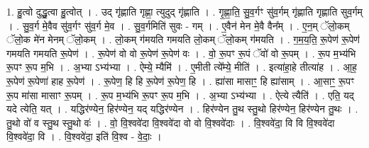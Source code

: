 \documentclass[17pt]{extarticle}
\begin{document}
1. हु॒त्वो दुद्धु॒त्वा हु॒त्वोत् । . उद् गृ॑ह्णाति गृह्णा॒ त्युदुद् गृ॑ह्णाति । . गृ॒ह्णा॒ति॒ सु॒व॒र्गꣳ सु॑व॒र्गम् गृ॑ह्णाति गृह्णाति सुव॒र्गम् । . सु॒व॒र्ग मे॒वैव सु॑व॒र्गꣳ सु॑व॒र्ग मे॒व । . सु॒व॒र्गमिति॑ सुवः - गम् । . ए॒वैन॑ मेन मे॒वै वैन᳚म् । . ए॒न॒म् ॅलो॒कम् ॅलो॒क मे॑न मेनम् ॅलो॒कम् । . लो॒कम् ग॑मयति गमयति लो॒कम् ॅलो॒कम् ग॑मयति । . ग॒म॒य॒ति॒ रू॒पेण॑ रू॒पेण॑ गमयति गमयति रू॒पेण॑ । . रू॒पेण॑ वो वो रू॒पेण॑ रू॒पेण॑ वः । . वो॒ रू॒पꣳ रू॒पं ॅवो॑ वो रू॒पम् । . रू॒प म॒भ्य॑भि रू॒पꣳ रू॒प म॒भि । . अ॒भ्या ऽभ्य॑भ्या । . ऐम्ये॒ म्यैमि॑ । . ए॒मीती त्ये᳚म्ये॒ मीति॑ । . इत्या॑हा॒हे तीत्या॑ह । . आ॒ह॒ रू॒पेण॑ रू॒पेणा॑ हाह रू॒पेण॑ । . रू॒पेण॒ हि हि रू॒पेण॑ रू॒पेण॒ हि । . ह्या॑सा मासाꣳ॒॒ हि ह्या॑साम् । . आ॒साꣳ॒॒ रू॒पꣳ रू॒प मा॑सा मासाꣳ रू॒पम् । . रू॒प म॒भ्य॑भि रू॒पꣳ रू॒प म॒भि । . अ॒भ्या ऽभ्य॑भ्या । . ऐत्ये त्यैति॑ । . एति॒ यद् यदे त्येति॒ यत् । . यद्धिर॑ण्येन॒ हिर॑ण्येन॒ यद् यद्धिर॑ण्येन । . हिर॑ण्येन तु॒थ स्तु॒थो हिर॑ण्येन॒ हिर॑ण्येन तु॒थः । . तु॒थो वो॑ व  स्तु॒थ स्तु॒थो वः॑ । . वो॒ वि॒श्ववे॑दा वि॒श्ववे॑दा वो वो वि॒श्ववे॑दाः । . वि॒श्ववे॑दा॒ वि वि वि॒श्ववे॑दा वि॒श्ववे॑दा॒ वि । . वि॒श्ववे॑दा॒ इति॑ वि॒श्व - वे॒दाः॒ । \newline
\end{document}
